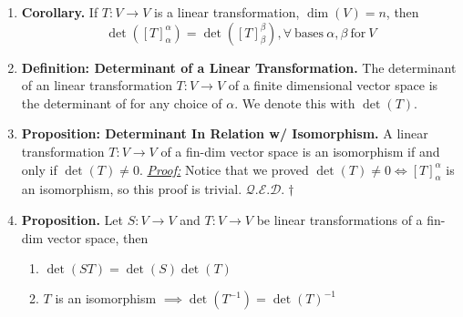 \documentclass[oneside, 12pt]{book}
\newcommand{\settag}[1]{\renewcommand{\theenumi}{#1}}
\newcommand{\qed}{\hfill $\mathcal{Q}.\mathcal{E}.\mathcal{D}.\dagger$}
\newcommand{\tbf}[1]{\textbf{#1}}
\newcommand{\tit}[1]{\textit{#1}}
\newcommand{\proof}{\tit{\underline{Proof:}}} %
\newcommand{\trans}[3]{$#1:#2\rightarrow{}#3$}
\newcommand{\map}[3]{\text{$\left[#1\right]_{#2}^{#3}$}}
\newcommand{\para}[1]{\item \tbf{#1}}
\begin{document}
\begin{enumerate}
    \settag{3.3.8}
    \para{Corollary.} If \trans{T}{V}{V} is a linear transformation, $\dim(V) = n$, then
    \begin{equation*}
        \det(\map{T}{\alpha}{\alpha}) = \det(\map{T}{\beta}{\beta}),\forall~\text{bases}~\alpha, \beta~\text{for}~V
    \end{equation*}
    
    \settag{3.3.9}
    \para{Definition: Determinant of a Linear Transformation.} The determinant of an linear transformation \trans{T}{V}{V} of a finite dimensional vector space is the determinant of \map{T}{\alpha}{\alpha} for any choice of $\alpha$. We denote this with $\det(T)$.
    
    \settag{3.3.11}
    \para{Proposition: Determinant In Relation w/ Isomorphism.} A linear transformation \trans{T}{V}{V} of a fin-dim vector space is an isomorphism if and only if $\det(T)\neq 0$. \newline
    \proof \newline
    Notice that we proved $\det(T)\neq 0 \iff \map{T}{\alpha}{\alpha}$ is an isomorphism, so this proof is trivial. \qed
    
    \settag{3.3.12}
    \para{Proposition.} Let \trans{S}{V}{V} and \trans{T}{V}{V} be linear transformations of a fin-dim vector space, then 
    \begin{enumerate}
        \item $\det(ST) = \det(S)\det(T)$
        \item $T$ is an isomorphism $\implies \det(T^{-1}) = \det(T)^{-1}$
    \end{enumerate}
    
    
\end{enumerate}
\end{document}
